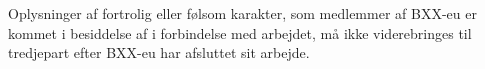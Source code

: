 
\noindent Oplysninger af fortrolig eller følsom karakter, som medlemmer af BXX-eu er kommet i besiddelse af i forbindelse med arbejdet, må ikke viderebringes til tredjepart efter BXX-eu har afsluttet sit arbejde.
